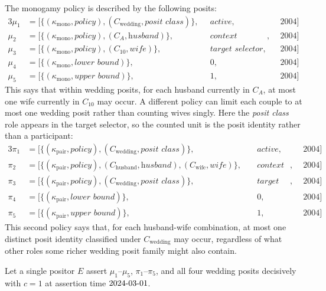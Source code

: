 \documentclass[a4paper,fleqn]{cas-sc}
\begin{document}
The monogamy policy is described by the following posits:
\begin{alignat*}{3}
\mu_1 &= [\{(\kappa_{\mathrm{mono}}, \textit{policy}), (C_{\mathrm{wedding}}, \textit{posit class})\},\;&& \textit{active},\;&& \textrm{2004}] \\
\mu_2 &= [\{(\kappa_{\mathrm{mono}}, \textit{policy}), (C_{A}, \textit{husband})\},\;&& \textit{context selector},\;&& \textrm{2004}] \\
\mu_3 &= [\{(\kappa_{\mathrm{mono}}, \textit{policy}), (C_{10}, \textit{wife})\},\;&& \textit{target selector},\;&& \textrm{2004}] \\
\mu_4 &= [\{(\kappa_{\mathrm{mono}}, \textit{lower bound})\},\;&& 0,\;&& \textrm{2004}] \\
\mu_5 &= [\{(\kappa_{\mathrm{mono}}, \textit{upper bound})\},\;&& 1,\;&& \textrm{2004}]
\end{alignat*}
This says that within wedding posits, for each husband currently in \(C_A\), at most one wife currently in \(C_{10}\) may occur. A different policy can limit each couple to at most one wedding posit rather than counting wives singly. Here the \textit{posit class} role appears in the target selector, so the counted unit is the posit identity rather than a participant:
\begin{alignat*}{3}
\pi_1 &= [\{(\kappa_{\mathrm{pair}}, \textit{policy}), (C_{\mathrm{wedding}}, \textit{posit class})\},\;&& \textit{active},\;&& \textrm{2004}] \\
\pi_2 &= [\{(\kappa_{\mathrm{pair}}, \textit{policy}), (C_{\mathrm{husband}}, \textit{husband}), (C_{\mathrm{wife}}, \textit{wife})\},\;&& \textit{context selector},\;&& \textrm{2004}] \\
\pi_3 &= [\{(\kappa_{\mathrm{pair}}, \textit{policy}), (C_{\mathrm{wedding}}, \textit{posit class})\},\;&& \textit{target selector},\;&& \textrm{2004}] \\
\pi_4 &= [\{(\kappa_{\mathrm{pair}}, \textit{lower bound})\},\;&& 0,\;&& \textrm{2004}] \\
\pi_5 &= [\{(\kappa_{\mathrm{pair}}, \textit{upper bound})\},\;&& 1,\;&& \textrm{2004}]
\end{alignat*}
This second policy says that, for each husband-wife combination, at most one distinct posit identity classified under \(C_{\mathrm{wedding}}\) may occur, regardless of what other roles some richer wedding posit family might also contain.

Let a single positor \(E\) assert \(\mu_1\)--\(\mu_5\), \(\pi_1\)--\(\pi_5\), and all four wedding posits decisively with \(c = 1\) at assertion time \(\textrm{2024\text{-}03\text{-}01}\).
\end{document}
